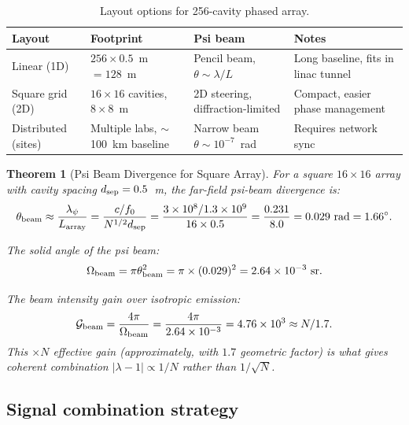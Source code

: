\documentclass[11pt,twocolumn]{article}
\newcommand{\lam}{\lambda}
\newcommand{\ee}[1]{\times 10^{#1}}
\newtheorem{theorem}{Theorem}[section]
\begin{document}
\begin{table}[h!]
\caption{Layout options for 256-cavity phased array.}
\label{tab:layout}
\begin{tabular}{p{2cm}p{2.5cm}p{2.5cm}p{2cm}}
\toprule
Layout & Footprint & Psi beam & Notes \\
\midrule
Linear (1D) & $256\times0.5$~m $= 128$~m & Pencil beam, $\theta \sim \lambda/L$ & Long baseline, fits in linac tunnel \\
Square grid (2D) & $16\times16$ cavities, $8\times8$~m & 2D steering, diffraction-limited & Compact, easier phase management \\
Distributed (sites) & Multiple labs, $\sim$100~km baseline & Narrow beam $\theta\sim10^{-7}$~rad & Requires network sync \\
\bottomrule
\end{tabular}
\end{table}

\begin{theorem}[Psi Beam Divergence for Square Array]
\label{thm:beam_divergence}
For a square $16\times16$ array with cavity spacing $d_{\rm sep} = 0.5$~m,
the far-field psi-beam divergence is:
\begin{equation}
\theta_{\rm beam} \approx \frac{\lambda_\psi}{L_{\rm array}}
= \frac{c/f_0}{N^{1/2} d_{\rm sep}}
= \frac{3\ee{8}/1.3\ee{9}}{16\times0.5}
= \frac{0.231}{8.0} = 0.029~\text{rad} = 1.66^\circ.
\label{eq:beam_divergence}
\end{equation}

The solid angle of the psi beam:
\begin{equation}
\Omega_{\rm beam} = \pi\theta_{\rm beam}^2
= \pi\times(0.029)^2 = 2.64\ee{-3}~\text{sr}.
\label{eq:solid_angle}
\end{equation}

The beam intensity gain over isotropic emission:
\begin{equation}
\mathcal{G}_{\rm beam} = \frac{4\pi}{\Omega_{\rm beam}}
= \frac{4\pi}{2.64\ee{-3}} = 4.76\ee{3} \approx N/1.7.
\label{eq:beam_gain}
\end{equation}
This $\times N$ effective gain (approximately, with $1.7$ geometric factor)
is what gives coherent combination $|\lam-1|\propto 1/N$ rather than
$1/\sqrt{N}$.
\end{theorem}

\subsection{Signal combination strategy}
\label{sec:signal_combination}
\end{document}
